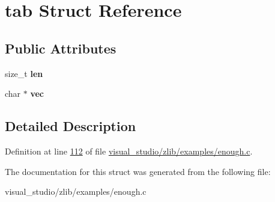 \hypertarget{structtab}{}\section{tab Struct Reference}
\label{structtab}
\subsection*{Public Attributes}
\begin{DoxyCompactItemize}
\item 
\mbox{\label{structtab_a7f06b129361240fd161e92a1043df401}} 
size\+\_\+t {\bfseries len}
\item 
\mbox{\label{structtab_a2fb64d1facc72832ea85cac26f0a547d}} 
char $\ast$ {\bfseries vec}
\end{DoxyCompactItemize}


\subsection{Detailed Description}


Definition at line \hyperlink{visual__studio_2zlib_2examples_2enough_8c_source_l00112}{112} of file \hyperlink{visual__studio_2zlib_2examples_2enough_8c_source}{visual\+\_\+studio/zlib/examples/enough.\+c}.



The documentation for this struct was generated from the following file\+:\begin{DoxyCompactItemize}
\item 
visual\+\_\+studio/zlib/examples/enough.\+c\end{DoxyCompactItemize}
